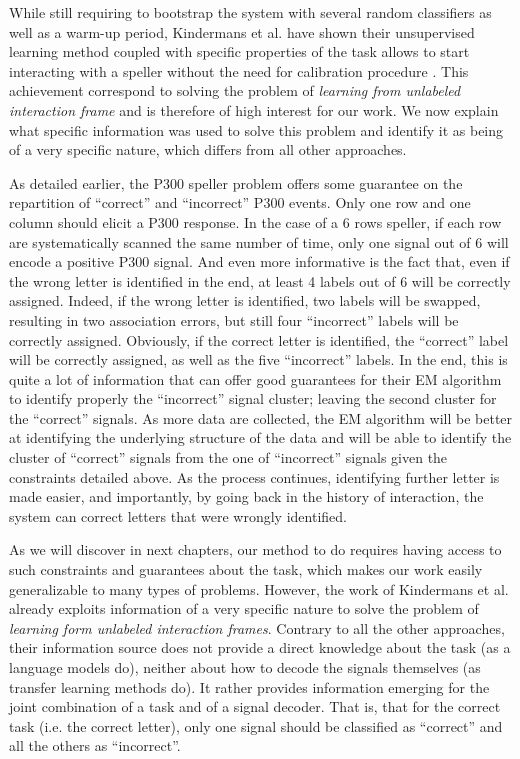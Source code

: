 While still requiring to bootstrap the system with several random classifiers as well as a warm-up period, Kindermans et al. have shown their unsupervised learning method coupled with specific properties of the task allows to start interacting with a speller without the need for calibration procedure \cite{Kindermans2012a,kindermans2014true}. This achievement correspond to solving the problem of \emph{learning from unlabeled interaction frame} and is therefore of high interest for our work. We now explain what specific information was used to solve this problem and identify it as being of a very specific nature, which differs from all other approaches.

As detailed earlier, the P300 speller problem offers some guarantee on the repartition of ``correct'' and ``incorrect'' P300 events. Only one row and one column should elicit a P300 response. In the case of a 6 rows speller, if each row are systematically scanned the same number of time, only one signal out of 6 will encode a positive P300 signal. And even more informative is the fact that, even if the wrong letter is identified in the end, at least 4 labels out of 6 will be correctly assigned. Indeed, if the wrong letter is identified, two labels will be swapped, resulting in two association errors, but still four ``incorrect'' labels will be correctly assigned. Obviously, if the correct letter is identified, the ``correct'' label will be correctly assigned, as well as the five ``incorrect'' labels. In the end, this is quite a lot of information that can offer good guarantees for their EM algorithm to identify properly the ``incorrect'' signal cluster; leaving the second cluster for the ``correct'' signals. As more data are collected, the EM algorithm will be better at identifying the underlying structure of the data and will be able to identify the cluster of ``correct'' signals from the one of ``incorrect'' signals given the constraints detailed above. As the process continues, identifying further letter is made easier, and importantly, by going back in the history of interaction, the system can correct letters that were wrongly identified.

As we will discover in next chapters, our method to do requires having access to such constraints and guarantees about the task, which makes our work easily generalizable to many types of problems. However, the work of Kindermans et al. already exploits information of a very specific nature to solve the problem of \emph{learning form unlabeled interaction frames}. Contrary to all the other approaches, their information source does not provide a direct knowledge about the task (as a language models do), neither about how to decode the signals themselves (as transfer learning methods do). It rather provides information emerging for the joint combination of a task and of a signal decoder. That is, that for the correct task (i.e. the correct letter), only one signal should be classified as ``correct'' and all the others as ``incorrect''. 

